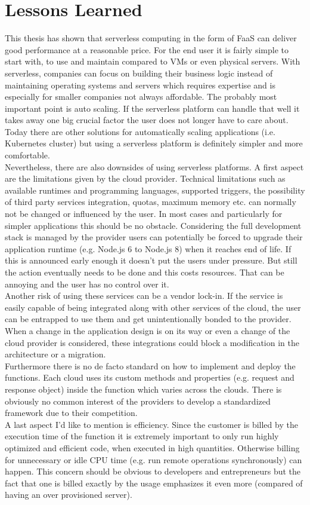 
\section{Lessons Learned}
This thesis has shown that serverless computing in the form of \gls{FaaS} can deliver good performance at a reasonable price. For the end user it is fairly simple to start with, to use and maintain compared to \gls{VM}s or even physical servers. With serverless, companies can focus on building their business logic instead of maintaining operating systems and servers which requires expertise and is especially for smaller companies not always affordable. The probably most important point is auto scaling. If the serverless platform can handle that well it takes away one big crucial factor the user does not longer have to care about. Today there are other solutions for automatically scaling applications (i.e. Kubernetes cluster) but using a serverless platform is definitely simpler and more comfortable.\\
Nevertheless, there are also downsides of using serverless platforms. A first aspect are the limitations given by the cloud provider. Technical limitations such as available runtimes and programming languages, supported triggers, the possibility of third party services integration, quotas, maximum memory etc. can normally not be changed or influenced by the user. In most cases and particularly for simpler applications this should be no obstacle. Considering the full development stack is managed by the provider users can potentially be forced to upgrade their application runtime (e.g. Node.js 6 to Node.js 8) when it reaches end of life. If this is announced early enough it doesn't put the users under pressure. But still the action eventually needs to be done and this costs resources. That can be annoying and the user has no control over it.\\
Another risk of using these services can be a vendor lock-in. If the service is easily capable of being integrated along with other services of the cloud, the user can be entrapped to use them and get unintentionally bonded to the provider. When a change in the application design is on its way or even a change of the cloud provider is considered, these integrations could block a modification in the architecture or a migration.\\
Furthermore there is no de facto standard on how to implement and deploy the functions. Each cloud uses its custom methods and properties (e.g. request and response object) inside the function which varies across the clouds. There is obviously no common interest of the providers to develop a standardized framework due to their competition.\\
A last aspect I'd like to mention is efficiency. Since the customer is billed by the execution time of the function it is extremely important to only run highly optimized and efficient code, when executed in high quantities. Otherwise billing for unnecessary or idle \gls{CPU} time (e.g. run remote operations synchronously) can happen. This concern should be obvious to developers and entrepreneurs but the fact that one is billed exactly by the usage emphasizes it even more (compared of having an over provisioned server).